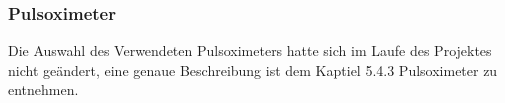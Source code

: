 ﻿\subsubsection{Pulsoximeter} \label{pulsoximeter-1}

Die Auswahl des Verwendeten Pulsoximeters hatte sich im Laufe des Projektes nicht geändert, eine genaue Beschreibung ist dem Kaptiel 5.4.3 Pulsoximeter zu entnehmen.

